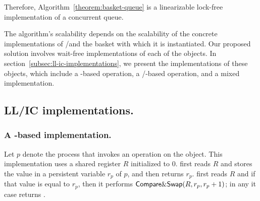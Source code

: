\begin{proofT}
  Therefore, Algorithm~\ref{theorem:basket-queue} is a linearizable lock-free implementation of a concurrent queue.
\end{proofT}

The algorithm's scalability depends on the scalability of the concrete implementations of \LL/\IC and the basket with which it is instantiated. Our proposed solution involves wait-free implementations of each of the objects. In section~\ref{subsec:ll-ic-implementations}, we present the implementations of these objects, which include a \CAS-based operation, a \R/\W-based operation, and a mixed implementation.

\subsection{\label{subsec:ll-ic-implementations}LL/IC implementations.}

\subsubsection{A \CAS-based implementation.}
Let $p$ denote the process that invokes an operation on the object. This implementation uses a shared register $R$ initialized to 0.  \LL first reads $R$ and stores the value in a persistent variable $r_p$ of $p$, and then returns $r_p$.  \IC first reads $R$ and if that value is equal to $r_p$, then it performs ${\sf Compare\&Swap}(R, r_p, r_p+1)$; in any it case returns \ok.

\begin{figure}[ht!]
\end{figure}

